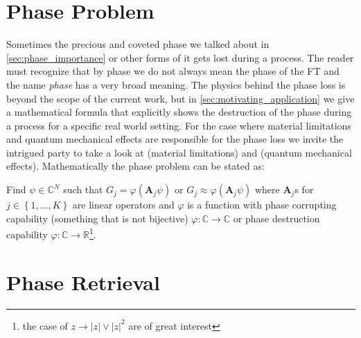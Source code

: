 \section{Phase Problem}
Sometimes the precious and coveted phase we talked about in \cref{sec:phase_importance} or other forms of it gets lost during a process. The reader must recognize 
that by phase we do not always mean the phase of the \ac{FT} and the name \emph{phase} has a very broad meaning. The physics behind the phase loss is beyond the 
scope of the current work, but in \cref{sec:motivating_application} we give a mathematical formula  that explicitly shows the destruction of the phase 
during a process for a specific real world setting. For the case where material limitations and quantum mechanical effects are responsible for the phase loss we invite 
the intrigued party to take a look at \cite{Shechtman2015} (material limitations) and \cite{DGDS2018}\cite{FranzSchwabl2007} (quantum mechanical effects). 
Mathematically the phase problem can be stated as:
\begin{Pro}\label{pro:phase_problem}
Find $\psi \in \mathbb{C}^N$ such that $G_j = \varphi(\boldsymbol{A}_j\psi)$ or $G_j \approx \varphi(\boldsymbol{A}_j\psi)$ where 
$\boldsymbol{A}_j$s for $j \in \left\{1,\ldots,K\right\}$ are linear operators  and $\varphi$ is a function with 
phase corrupting capability (something that is not bijective)  $\varphi \colon \mathbb{C} \to \mathbb{C}$ or phase destruction capability 
$\varphi \colon \mathbb{C} \to \mathbb{R}$\footnote{the case of $z \rightarrow \left|z\right| \lor {\left|z\right|^2}$ 
are of great interest}.
\end{Pro} 






\section{Phase Retrieval}

